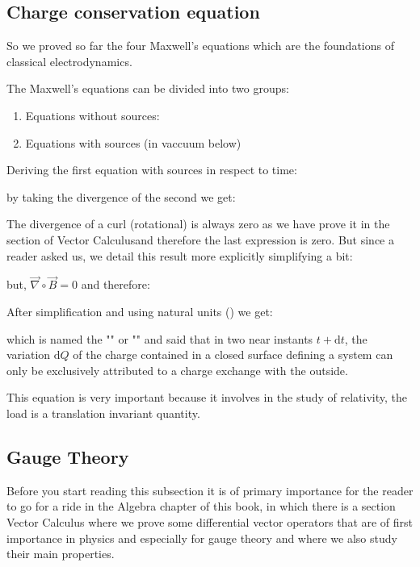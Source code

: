 	\subsection{Charge conservation equation}
	So we proved so far the four Maxwell's equations which are the foundations of classical electrodynamics.

	The Maxwell's equations can be divided into two groups:
	\begin{enumerate}
		\item Equations without sources:
		

		\item Equations with sources (in vaccuum below)
		
	\end{enumerate}
	Deriving the first equation with sources in respect to time:
	
	by taking the divergence of the second we get:
	
	The divergence of a curl (rotational) is always zero as we have prove it in the section of Vector Calculusand therefore the last expression is zero. But since a reader asked us, we detail this result more explicitly simplifying a bit:
	
	but, $\vec{\nabla}\circ\vec{B}=0$ and therefore:
	
	After simplification and using natural units () we get:
	
	which is named the  "" or "" and said that in two near instants $t+\mathrm{d}t$, the variation $\mathrm{d}Q$ of the charge contained in a closed surface defining a system can only be exclusively  attributed to a charge exchange with the outside.
	
	This equation is very important because it involves in the study of relativity, the load is a translation invariant quantity.
	
	\subsection{Gauge Theory}
	Before you start reading this subsection it is of primary importance for the reader to go for a ride in the Algebra chapter of this book, in which there is a section Vector Calculus where we prove some differential vector operators that are of first importance in physics and especially for gauge theory and where we also study their main properties.
	
